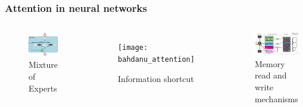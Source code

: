 \documentclass{beamer}
\begin{document}
  \begin{frame}
    \frametitle{Attention in neural networks}
    \begin{columns}
      \begin{figure}
        \includegraphics[width=\textwidth]{mixture_of_experts}
        \caption{Mixture of Experts}
      \end{figure}
      \begin{figure}
        \texttt{[image: bahdanu\_attention]}
        \caption{Information shortcut}
      \end{figure}
      \begin{figure}
        \includegraphics[width=\textwidth]{dnc}
        \caption{Memory read and write mechanisms}
      \end{figure}
    \end{columns}
    \vfill
    \tiny {}
    \tiny {}
    \tiny {}
  \end{frame}
\end{document}
